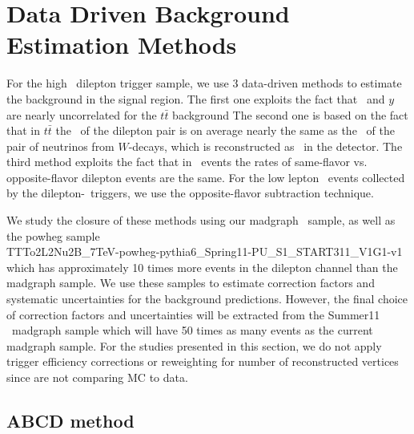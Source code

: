\section{Data Driven Background Estimation Methods}
\label{sec:datadriven}

For the high \pt\ dilepton trigger sample, we use 3 data-driven methods to 
estimate the background in the signal region. The first one exploits the fact that 
\Ht\ and $y$ are nearly uncorrelated for the $t\bar{t}$ background The second one 
is based on the fact that in $t\bar{t}$ the \pt\ of the dilepton pair is on average 
nearly the same as the \pt\ of the pair of neutrinos
from $W$-decays, which is reconstructed as \met\ in the
detector. The third method exploits the fact that in \ttbar\ events
the rates of same-flavor vs. opposite-flavor dilepton events are
the same. For the low lepton \pt\ events collected by the dilepton-\Ht\ triggers,
we use the opposite-flavor subtraction technique.

We study the closure of these methods using our madgraph \ttbar\ sample, as well as 
the powheg sample \\
TTTo2L2Nu2B\_7TeV-powheg-pythia6\_Spring11-PU\_S1\_START311\_V1G1-v1
which has approximately 10 times more events in the dilepton channel than the madgraph sample.
We use these samples to estimate correction factors and systematic uncertainties for the background predictions. 
However, the final choice of correction factors and uncertainties will be extracted from the Summer11 \ttbar\ madgraph
sample which will have 50 times as many events as the current madgraph sample. 
For the studies presented in this section, we do not apply trigger efficiency corrections or reweighting for
number of reconstructed vertices since are not comparing MC to data. 

\subsection{ABCD method}
\label{sec:abcd}



